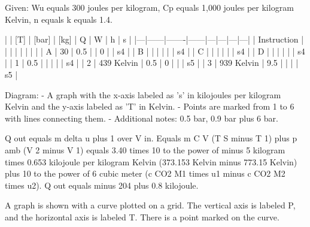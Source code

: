 Given: Wu equals 300 joules per kilogram, Cp equals 1,000 joules per kilogram Kelvin, n equals k equals 1.4.

|   | [T]  | [bar] | [kg] | Q | W | h | s |
|---|------|-------|------|---|---|---|---|
| Instruction |   |   |   |   |   |   |   |
| A | 30 | 0.5 |   | 0 |   | s4 |
| B |   |   |   |   |   | s4 |
| C |   |   |   |   |   | s4 |
| D |   |   |   |   |   | s4 |
| 1 | 0.5 |   |   |   |   | s4 |
| 2 | 439 Kelvin | 0.5 | 0 |   |   | s5 |
| 3 | 939 Kelvin | 9.5 |   |   |   | s5 |

Diagram:
- A graph with the x-axis labeled as 's' in kilojoules per kilogram Kelvin and the y-axis labeled as 'T' in Kelvin.
- Points are marked from 1 to 6 with lines connecting them.
- Additional notes: 0.5 bar, 0.9 bar plus 6 bar.

Q out equals m delta u plus 1 over V in. Equals m C V (T S minus T 1) plus p amb (V 2 minus V 1) equals 3.40 times 10 to the power of minus 5 kilogram times 0.653 kilojoule per kilogram Kelvin (373.153 Kelvin minus 773.15 Kelvin) plus 10 to the power of 6 cubic meter (c CO2 M1 times u1 minus c CO2 M2 times u2). Q out equals minus 204 plus 0.8 kilojoule.

A graph is shown with a curve plotted on a grid. The vertical axis is labeled P, and the horizontal axis is labeled T. There is a point marked on the curve.